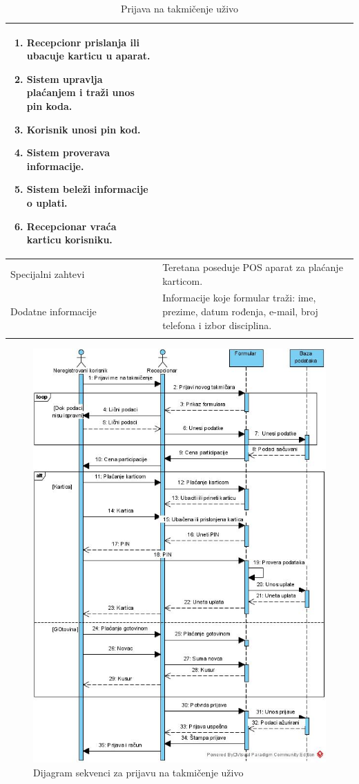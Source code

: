 \documentclass[../../main.tex]{subfiles}
\begin{document}
\begin{longtable}{| p{} | p{} |}
\begin{itemize}
\begin{enumerate}
            \item Recepcionr prislanja ili ubacuje karticu u aparat.
            \item Sistem upravlja plaćanjem i traži unos pin koda.
            \item Korisnik unosi pin kod.
            \item Sistem proverava informacije.
            \item Sistem beleži informacije o uplati.
            \item Recepcionar vraća karticu korisniku.	
        \end{enumerate}
    \end{itemize}\\
\hline
    Specijalni zahtevi & Teretana poseduje POS aparat za plaćanje karticom.\\
\hline
    Dodatne informacije & Informacije koje formular traži: ime, prezime, datum rođenja, e-mail, broj telefona i izbor disciplina.\\
\hline
\caption{Prijava na takmičenje uživo} %
\end{longtable}

\begin{figure}[!ht]
\begin{center}
\includegraphics[scale=0.55]{sections/images/takmicenje_prijava_uzivo_dijagram_sekvenci.jpg}
\end{center}
\caption{Dijagram sekvenci za prijavu na takmičenje uživo}
\label{fig:kontekst}
\end{figure}
\end{document}
